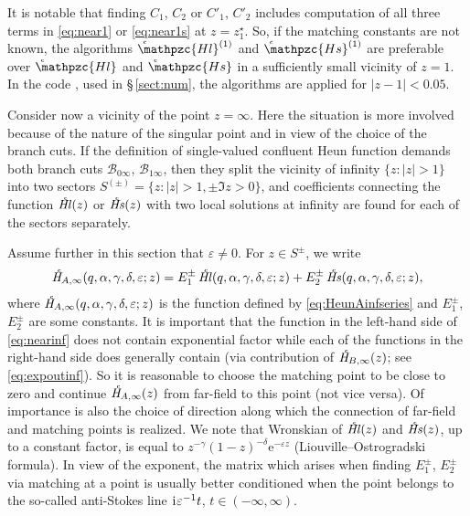 \documentclass[11pt]{article}
\newcommand{\MF}[1]{\mathop{#1}\nolimits}
\newcommand{\ii}{\kern0.05em\mathrm{i}\kern0.05em} \newcommand{\E}[1]{\textrm{e}^{#1}}
\newcommand{\SectInf}{S}%
\newcommand{\BCzero}{\mathscr{B}_{0\infty}}%
\newcommand{\BCone}{\mathscr{B}_{1\infty}}%
\def\midpoint#1{z^\star_{#1}}%
\def\HeunC{\displaystyle\setbox0=\hbox{\tiny\itshape\bfseries \kern1.52mm c}\wd0=0pt\ht0=0pt\dp0=0pt\MF{\textit{\hbox{\raise1.67ex\copy0}H\/}}}%
\def\HeunCl{\setbox0=\hbox{\tiny\itshape\bfseries \kern1.52mm c}\wd0=0pt\ht0=0pt\dp0=0pt\MF{\textit{\hbox{\raise1.67ex\copy0}Hl\/}}}%
\def\HeunCs{\setbox0=\hbox{\tiny\itshape\bfseries \kern1.52mm c}\wd0=0pt\ht0=0pt\dp0=0pt\MF{\textit{\hbox{\raise1.67ex\copy0}Hs\/}}}%
\def\psHeunClfin{\setbox0=\hbox{\tiny\itshape\bfseries \kern1.52mm c}\wd0=0pt\ht0=0pt\dp0=0pt\MF{\hbox{\raise1.67ex\copy0}\mathpzc{Hl}}}%
\def\psHeunCsfin{\setbox0=\hbox{\tiny\itshape\bfseries \kern1.52mm c}\wd0=0pt\ht0=0pt\dp0=0pt\MF{\hbox{\raise1.67ex\copy0}\mathpzc{Hs}}}%
\def\psHeunClnearone{\setbox0=\hbox{\tiny\itshape\bfseries \kern1.52mm c}\wd0=0pt\ht0=0pt\dp0=0pt\MF{\hbox{\raise1.67ex\copy0}\mathpzc{Hl}^{(1)}}}%
\def\psHeunCsnearone{\setbox0=\hbox{\tiny\itshape\bfseries \kern1.52mm c}\wd0=0pt\ht0=0pt\dp0=0pt\MF{\hbox{\raise1.67ex\copy0}\mathpzc{Hs}^{(1)}}}%
\begin{document}
It is notable that finding $C_1$, $C_2$ or $C'_1$, $C'_2$ includes computation of
all three terms in \eqref{eq:near1}
or \eqref{eq:near1s} at $z=\midpoint{1}$. So, if the matching constants are not known, the
algorithms $\psHeunClnearone$ and $\psHeunCsnearone$ are preferable over
$\psHeunClfin$ and $\psHeunCsfin$ in a sufficiently small vicinity of $z=1$. In
the code \cite{mycode2}, used in \S\,\ref{sect:num}, the algorithms are applied for $|z-1|<0.05$.


Consider now a vicinity of the point $z=\infty$. Here the situation is more involved because of the nature of the singular point and in view of the choice of the branch cuts. If the definition of single-valued confluent Heun function demands both branch cuts $\BCzero$,
$\BCone$, then they split the vicinity of infinity
$\{z:|z|>1\}$ into two sectors
$\SectInf^{(\pm)}=\{z:|z|>1,\pm\Im z>0\}$, and coefficients connecting
the function $\HeunCl(z)$ or $\HeunCs(z)$ with two local solutions at infinity are found for
each of the sectors separately.

Assume further in this section that $\varepsilon\neq0$.  For $z\in\SectInf^{\pm}$, we write
\begin{equation}
\HeunC_{\!A,\infty}(q,\alpha,\gamma,\delta,\varepsilon;z)=
E^{\pm}_1 \HeunCl(q,\alpha,\gamma,\delta,\varepsilon;z) + 
E^{\pm}_2 \HeunCs(q,\alpha,\gamma,\delta,\varepsilon;z),
\label{eq:nearinf}
\end{equation}
where $\HeunC_{\!A,\infty}(q,\alpha,\gamma,\delta,\varepsilon;z)$ is the function defined by \eqref{eq:HeunAinfseries} and $E^{\pm}_1$, $E^{\pm}_2$ are some constants. 
It is important that the function in the left-hand side of \eqref{eq:nearinf} does not contain exponential factor while each of the functions in the right-hand side does generally contain (via contribution of $\HeunC_{\!B,\infty}(z)$; see \eqref{eq:expoutinf}). So it is reasonable to choose the matching point to be close to zero and continue $\HeunC_{\!A,\infty}(z)$ from far-field to this point (not vice versa). 
Of importance is also the choice of direction along which the connection of far-field and matching points is realized. We note that Wronskian of $\HeunCl(z)$ and $\HeunCs(z)$, up to a constant factor, is equal to $z^{-\gamma} (1-z)^{-\delta}\E{-\varepsilon z}$ (Liouville--Ostrogradski formula). In view of the exponent, the matrix which arises when finding $E^{\pm}_1$, $E^{\pm}_2$ via matching at a point is usually better conditioned when the point belongs to the so-called anti-Stokes line $\ii \varepsilon^{-1}t$, $t\in(-\infty,\infty)$.
\end{document}
